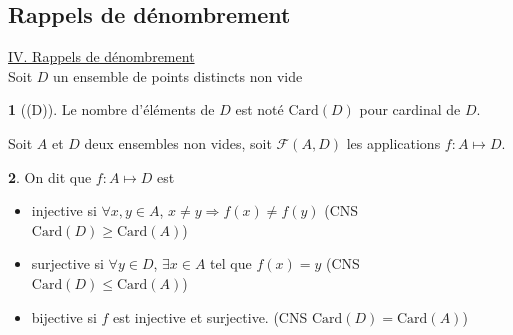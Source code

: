 \documentclass[8pt,notheorems]{beamer}
\theoremstyle{definition}
\newtheorem{definition}{\translate{Definition}}
\theoremstyle{example}
\theoremstyle{mystyle}
\theoremstyle{plain}
\begin{document}
\begin{frame}[allowframebreaks]
\section{Rappels de dénombrement}
\underline{IV. Rappels de dénombrement}\\
Soit $D$ un ensemble de points distincts non vide
\begin{definition}[(D)]
Le nombre d'éléments de $D$ est noté $\text{Card}(D)$ pour cardinal de $D$.
\end{definition}
Soit $A$ et $D$ deux ensembles non vides, soit $\mathcal{F}(A,D)$ les applications $f:A\mapsto D$.
\begin{definition}
On dit que $f:A\mapsto D$ est 
\begin{itemize}
    \item injective si $\forall x,y\in A$, $x\neq y \Rightarrow f(x)\neq f(y)$ (CNS $\text{Card}(D)\geq \text{Card}(A)$)
    \item surjective si $\forall y \in D$, $\exists x\in A$ tel que $f(x)  = y$ (CNS $\text{Card}(D)\leq \text{Card}(A)$)
    \item bijective si $f$ est injective et surjective. (CNS $\text{Card}(D)= \text{Card}(A)$) 
\end{itemize}
\end{definition}
 

\end{frame}
\end{document}
